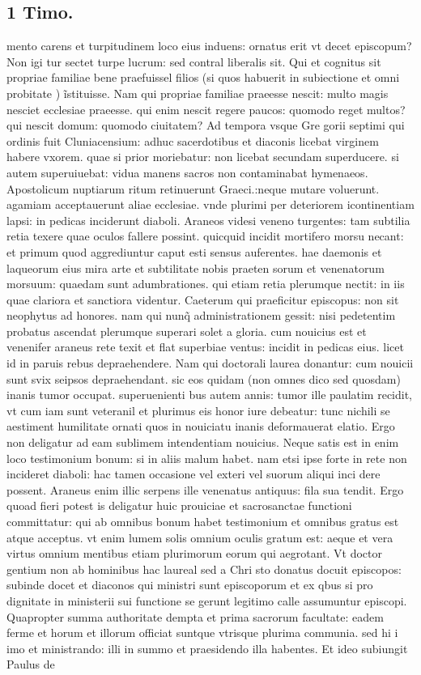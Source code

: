 \documentclass{article}
\begin{document}
\begin{pages}
\section*{1 Timo. }
\marginpar{[ p.205 ]}\pstart mento carens et turpitudinem loco eius induens: ornatus erit vt decet episcopum? Non igi tur sectet turpe lucrum: sed contral liberalis sit. Qui et cognitus sit propriae familiae bene praefuissel filios (si quos habuerit in subiectione et omni probitate ) ĩstituisse. Nam qui propriae familiae praeesse nescit: multo magis nesciet ecclesiae praeesse. qui enim nescit regere paucos: quomodo reget multos? qui nescit domum: quomodo ciuitatem? Ad tempora vsque Gre gorii septimi qui ordinis fuit Cluniacensium: adhuc sacerdotibus et diaconis licebat virginem habere vxorem. quae si prior moriebatur: non licebat secundam superducere. si autem superuiuebat: vidua manens sacros non contaminabat hymenaeos. Apostolicum nuptiarum ritum retinuerunt Graeci.:neque mutare voluerunt. agamiam acceptauerunt aliae ecclesiae. vnde plurimi per deteriorem icontinentiam lapsi: in pedicas inciderunt diaboli. Araneos videsi veneno turgentes: tam subtilia retia texere quae oculos fallere possint. quicquid incidit mortifero morsu necant: et primum quod aggrediuntur caput esti sensus auferentes. hae daemonis et laqueorum eius mira arte et subtilitate nobis praeten sorum et venenatorum morsuum: quaedam sunt adumbrationes. qui etiam retia plerumque  nectit: in iis quae clariora et sanctiora videntur. Caeterum qui praeficitur episcopus: non sit neophytus ad honores. nam qui nunq̃ administrationem gessit: nisi pedetentim probatus ascendat plerumque superari solet a gloria. cum nouicius est et venenifer araneus rete texit et flat superbiae ventus: incidit in pedicas eius. licet id in paruis rebus depraehendere. Nam qui doctorali laurea donantur: cum nouicii sunt svix seipsos depraehendant. sic eos quidam (non omnes dico sed quosdam) inanis tumor occupat. superuenienti bus autem annis: tumor ille paulatim recidit, vt cum iam sunt veteranil et plurimus eis honor iure debeatur: tunc nichili se aestiment humilitate ornati quos in nouiciatu inanis deformauerat elatio. Ergo non deligatur ad eam sublimem intendentiam nouicius. Neque satis est in enim loco testimonium bonum: si in aliis malum habet. nam etsi ipse forte in rete non incideret diaboli: hac tamen occasione vel exteri vel suorum aliqui inci dere possent. Araneus enim illic serpens ille venenatus antiquus: fila sua tendit. Ergo quoad fieri potest is deligatur huic prouiciae et sacrosanctae functioni committatur: qui ab omnibus bonum habet testimonium et omnibus gratus est atque acceptus. vt enim lumem solis omnium oculis gratum est: aeque et vera virtus omnium mentibus etiam plurimorum eorum qui aegrotant. Vt doctor gentium non ab hominibus hac laureal sed a Chri sto donatus docuit episcopos: subinde docet et diaconos qui ministri sunt episcoporum  et ex qbus si pro dignitate in ministerii sui functione se gerunt legitimo calle assumuntur episcopi. Quapropter summa authoritate dempta et prima sacrorum facultate: eadem ferme et horum et illorum officiat suntque vtrisque plurima communia. sed hi i imo et ministrando: illi in summo et praesidendo illa habentes. Et ideo subiungit Paulus de 
\end{pages}
\end{document}
